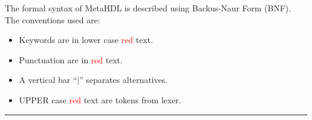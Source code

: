 The formal syntax of MetaHDL is described using Backus-Naur Form (BNF). 
The conventions used are:
\begin{itemize}
\item Keywords are in lower case \textcolor{red}{red} text.
\item Punctuation are in \textcolor{red}{red} text.
\item A vertical bar ``$|$'' separates alternatives. 
\item UPPER case \textcolor{red}{red} text are tokens from lexer.
\end{itemize}
\rule{130mm}{1pt}\\[1cm]


\begin{small}
  
\end{small}

